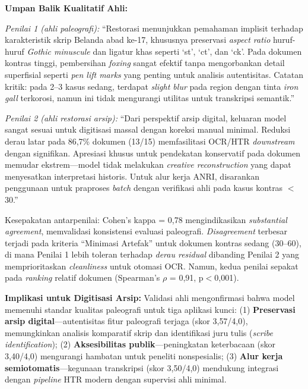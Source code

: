 \documentclass[12pt,a4paper]{article}
\begin{document}
\textbf{Umpan Balik Kualitatif Ahli:}

\textit{Penilai 1 (ahli paleografi):} ``Restorasi menunjukkan pemahaman implisit terhadap karakteristik skrip Belanda abad ke-17, khususnya preservasi \textit{aspect ratio} huruf-huruf \textit{Gothic minuscule} dan ligatur khas seperti `st', `ct', dan `ck'. Pada dokumen kontras tinggi, pembersihan \textit{foxing} sangat efektif tanpa mengorbankan detail superfisial seperti \textit{pen lift marks} yang penting untuk analisis autentisitas. Catatan kritik: pada 2--3 kasus sedang, terdapat \textit{slight blur} pada region dengan tinta \textit{iron gall} terkorosi, namun ini tidak mengurangi utilitas untuk transkripsi semantik.''

\textit{Penilai 2 (ahli restorasi arsip):} ``Dari perspektif arsip digital, keluaran model sangat sesuai untuk digitisasi massal dengan koreksi manual minimal. Reduksi derau latar pada 86,7\% dokumen (13/15) memfasilitasi OCR/HTR \textit{downstream} dengan signifikan. Apresiasi khusus untuk pendekatan konservatif pada dokumen memudar ekstrem---model tidak melakukan \textit{creative reconstruction} yang dapat menyesatkan interpretasi historis. Untuk alur kerja ANRI, disarankan penggunaan untuk praproses \textit{batch} dengan verifikasi ahli pada kasus kontras $<$30.''

Kesepakatan antarpenilai: Cohen's kappa = 0,78 mengindikasikan \textit{substantial agreement}, memvalidasi konsistensi evaluasi paleografi. \textit{Disagreement} terbesar terjadi pada kriteria ``Minimasi Artefak'' untuk dokumen kontras sedang (30--60), di mana Penilai 1 lebih toleran terhadap \textit{derau residual} dibanding Penilai 2 yang memprioritaskan \textit{cleanliness} untuk otomasi OCR. Namun, kedua penilai sepakat pada \textit{ranking} relatif dokumen (Spearman's $\rho$ = 0,91, p$<$0,001).

\textbf{Implikasi untuk Digitisasi Arsip:} Validasi ahli mengonfirmasi bahwa model memenuhi standar kualitas paleografi untuk tiga aplikasi kunci: (1) \textbf{Preservasi arsip digital}---autentisitas fitur paleografi terjaga (skor 3,57/4,0), memungkinkan analisis komparatif skrip dan identifikasi juru tulis (\textit{scribe identification}); (2) \textbf{Aksesibilitas publik}---peningkatan keterbacaan (skor 3,40/4,0) mengurangi hambatan untuk peneliti nonspesialis; (3) \textbf{Alur kerja semiotomatis}---kegunaan transkripsi (skor 3,50/4,0) mendukung integrasi dengan \textit{pipeline} HTR modern dengan supervisi ahli minimal.

\vspace{0.8em}
\end{document}
